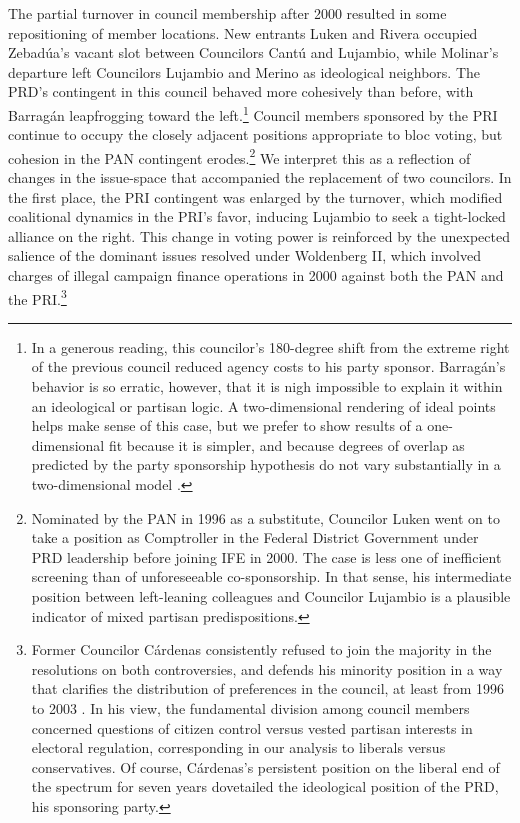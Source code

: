 \documentclass[12 pt, letter]{article}
\begin{document}
The partial turnover in council membership after 2000 resulted in
some repositioning of member locations.  New entrants Luken and
Rivera occupied Zebad\'ua's vacant slot between Councilors Cant\'u
and Lujambio, while Molinar's departure left Councilors Lujambio and
Merino as ideological neighbors.  The PRD's contingent in this
council behaved more cohesively than before, with Barrag\'an
leapfrogging toward the left.\footnote{In a generous reading, this
councilor's 180-degree shift from the extreme right of the previous
council reduced agency costs to his party sponsor.  Barrag\'an's
behavior is so erratic, however, that it is nigh impossible to
explain it within an ideological or partisan logic.  A
two-dimensional rendering of ideal points helps make sense of this
case, but we prefer to show results of a one-dimensional fit because
it is simpler, and because degrees of overlap as predicted by the
party sponsorship hypothesis do not vary substantially in a
two-dimensional model \citep[cf.][]{Rosas2005a}.} Council members
sponsored by the PRI continue to occupy the closely adjacent
positions appropriate to bloc voting, but cohesion in the PAN
contingent erodes.\footnote{Nominated by the PAN in 1996 as a
substitute, Councilor Luken went on to take a position as
Comptroller in the Federal District Government under PRD leadership
before joining IFE in 2000.  The case is less one of inefficient
screening than of unforeseeable co-sponsorship.  In that sense, his
intermediate position between left-leaning colleagues and Councilor
Lujambio is a plausible indicator of mixed partisan
predispositions.}  We interpret this as a reflection of changes in
the issue-space that accompanied the replacement of two councilors.
In the first place, the PRI contingent was enlarged by the turnover,
which modified coalitional dynamics in the PRI's favor, inducing
Lujambio to seek a tight-locked alliance on the right.  This change
in voting power is reinforced by the unexpected salience of the
dominant issues resolved under Woldenberg II, which involved charges
of illegal campaign finance operations in 2000 against both the PAN
and the PRI.\footnote{Former Councilor C\'ardenas consistently
refused to join the majority in the resolutions on both
controversies, and defends his minority position in a way that
clarifies the distribution of preferences in the council, at least
from 1996 to 2003 \citep{Cardenas2004}.  In his view, the
fundamental division among council members concerned questions of
citizen control versus vested partisan interests in electoral
regulation, corresponding in our analysis to liberals versus
conservatives. Of course, C\'ardenas's persistent position on the
liberal end of the spectrum for seven years dovetailed the
ideological position of the PRD, his sponsoring party.}
\end{document}
